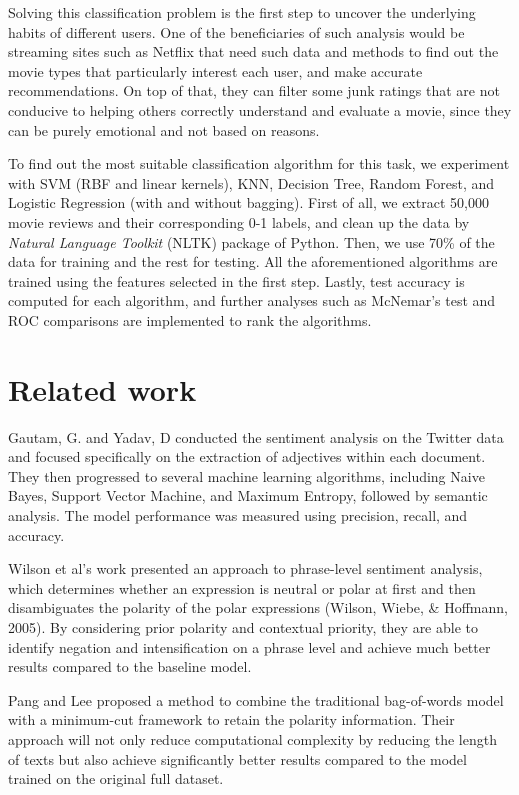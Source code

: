 \documentclass[10pt,twocolumn,letterpage]{article}
\begin{document}
			 Solving this classification problem is the first step to uncover the underlying habits of different users. One of the beneficiaries of such analysis would be streaming sites such as Netflix that need such data and methods to find out the movie types that particularly interest each user, and make accurate recommendations. On top of that, they can filter some junk ratings that are not conducive to helping others correctly understand and evaluate a movie, since they can be purely emotional and not based on reasons. 
			 
			 To find out the most suitable classification algorithm for this task, we experiment with SVM (RBF and linear kernels), KNN, Decision Tree, Random Forest, and Logistic Regression (with and without bagging). First of all, we extract 50,000 movie reviews and their corresponding 0-1 labels, and clean up the data by \textit{Natural Language Toolkit} (NLTK) package of Python. Then, we use 70\% of the data for training and the rest for testing. All the aforementioned algorithms are trained using the features selected in the first step. Lastly, test accuracy is computed for each algorithm, and further analyses such as McNemar's test and ROC comparisons are implemented to rank the algorithms.
		\section{Related work}
			Gautam, G. and Yadav, D conducted the sentiment analysis on the Twitter data and focused specifically on the extraction of adjectives within each document. They then progressed to several machine learning algorithms, including Naive Bayes, Support Vector Machine, and Maximum Entropy, followed by semantic analysis. The model performance was measured using precision, recall, and accuracy.

Wilson et al’s work presented an approach to phrase-level sentiment analysis, which determines whether an expression is neutral or polar at first and then disambiguates the polarity of the polar expressions (Wilson, Wiebe, \& Hoffmann, 2005).  By considering prior polarity and contextual priority, they are able to identify negation and intensification on a phrase level and achieve much better results compared to the baseline model.

Pang and Lee proposed a method to combine the traditional bag-of-words model with a minimum-cut framework to retain the polarity information. Their approach will not only reduce computational complexity by reducing the length of texts but also achieve significantly better results compared to the model trained on the original full dataset. 
\end{document}
